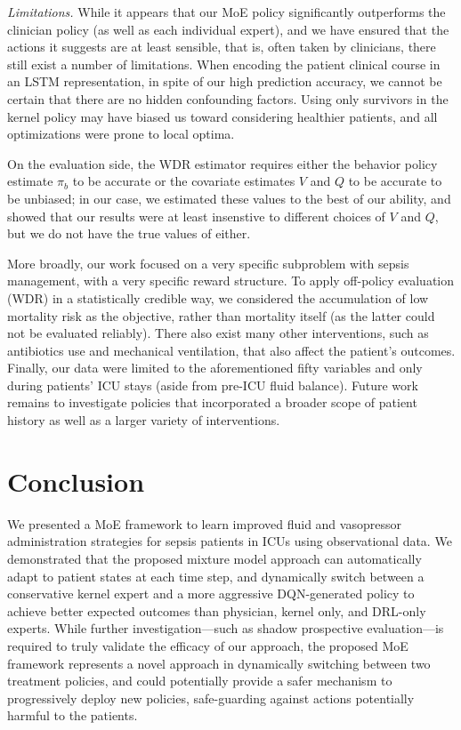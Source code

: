 \documentclass[10pt]{amia}
\begin{document}
\textit{Limitations.}
While it appears that our MoE policy significantly outperforms the clinician policy (as well as each individual expert), and we have ensured that the actions it suggests are at least sensible, that is, often taken by clinicians, there still exist a number of limitations.  When encoding the patient clinical course in an LSTM representation, in spite of our high prediction accuracy, we cannot be certain that there are no hidden confounding factors.  Using only survivors in the kernel policy may have biased us toward considering healthier patients, and all optimizations were prone to local optima. 

On the evaluation side, the WDR estimator requires either the behavior policy estimate $\pi_b$ to be accurate or the covariate estimates $V$ and $Q$ to be accurate to be unbiased; in our case, we estimated these values to the best of our ability, and showed that our results were at least insenstive to different choices of $V$ and $Q$, but we do not have the true values of either.

More broadly, our work focused on a very specific subproblem with sepsis management, with a very specific reward structure.  To apply off-policy evaluation (WDR) in a statistically credible way, we considered the accumulation of low mortality risk as the objective, rather than mortality itself (as the latter could not be evaluated reliably).  There also exist many other interventions, such as antibiotics use and mechanical ventilation, that also affect the patient's outcomes.  Finally, our data were limited to the aforementioned fifty variables and only during patients' ICU stays (aside from pre-ICU fluid balance). Future work remains to investigate policies that incorporated a broader scope of patient history as well as a larger variety of interventions.

\section*{Conclusion}

We presented a MoE framework to learn improved fluid and vasopressor administration strategies for sepsis patients in ICUs using observational data.   We demonstrated that the proposed mixture model approach can automatically adapt to patient states at each time step, and dynamically switch between a conservative kernel expert and a more aggressive DQN-generated policy to achieve better expected outcomes than physician, kernel only, and DRL-only experts. While further investigation---such as shadow prospective evaluation---is required to truly validate the efficacy of our approach, the proposed MoE framework represents a novel approach in dynamically switching between two treatment policies, and could potentially provide a safer mechanism to progressively deploy new policies, safe-guarding against actions potentially harmful to the patients. 
\end{document}
